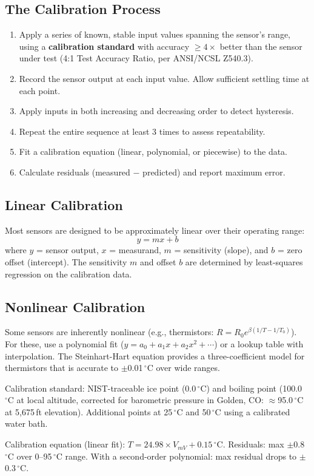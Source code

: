 \documentclass[11pt,letterpaper,twoside,openany]{book}
\newcommand{\degC}{\ensuremath{{}^{\circ}\text{C}}}
\begin{document}
\subsection{The Calibration Process}
\begin{enumerate}[leftmargin=1.5em]
\item Apply a series of known, stable input values spanning the sensor's range, using a \textbf{calibration standard} with accuracy $\geq 4\times$ better than the sensor under test (4:1 Test Accuracy Ratio, per ANSI/NCSL Z540.3).
\item Record the sensor output at each input value. Allow sufficient settling time at each point.
\item Apply inputs in both increasing and decreasing order to detect hysteresis.
\item Repeat the entire sequence at least 3 times to assess repeatability.
\item Fit a calibration equation (linear, polynomial, or piecewise) to the data.
\item Calculate residuals (measured $-$ predicted) and report maximum error.
\end{enumerate}

\subsection{Linear Calibration}
Most sensors are designed to be approximately linear over their operating range:
\begin{equation}
y = mx + b
\end{equation}
where $y$ = sensor output, $x$ = measurand, $m$ = sensitivity (slope), and $b$ = zero offset (intercept). The sensitivity $m$ and offset $b$ are determined by least-squares regression on the calibration data.

\subsection{Nonlinear Calibration}
Some sensors are inherently nonlinear (e.g., thermistors: $R = R_0 e^{\beta(1/T - 1/T_0)}$). For these, use a polynomial fit ($y = a_0 + a_1 x + a_2 x^2 + \cdots$) or a lookup table with interpolation. The Steinhart-Hart equation provides a three-coefficient model for thermistors that is accurate to $\pm$0.01\,\degC{} over wide ranges.

\begin{examplebox}
Calibration standard: NIST-traceable ice point (0.0\,\degC{}) and boiling point (100.0\,\degC{} at local altitude, corrected for barometric pressure in Golden, CO: $\approx$95.0\,\degC{} at 5,675\,ft elevation). Additional points at 25\,\degC{} and 50\,\degC{} using a calibrated water bath.

Calibration equation (linear fit): $T = 24.98 \times V_{mV} + 0.15$\,\degC{}. Residuals: max $\pm$0.8\,\degC{} over 0--95\,\degC{} range. With a second-order polynomial: max residual drops to $\pm$0.3\,\degC{}.
\end{examplebox}
\end{document}

